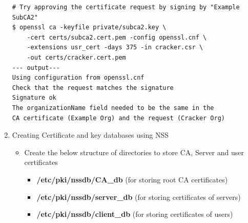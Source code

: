 \documentclass[a4paper]{article}
\begin{document}
\begin{enumerate}[label*=\arabic*.]
\begin{lstlisting}[style=bashInputStyle]
# Try approving the certificate request by signing by "Example SubCA2"
$ openssl ca -keyfile private/subca2.key \
    -cert certs/subca2.cert.pem -config openssl.cnf \
    -extensions usr_cert -days 375 -in cracker.csr \
    -out certs/cracker.cert.pem
--- output---
Using configuration from openssl.cnf
Check that the request matches the signature
Signature ok
The organizationName field needed to be the same in the
CA certificate (Example Org) and the request (Cracker Org)
            \end{lstlisting}
    \item Creating Certificate and key databases using NSS 
        \begin{itemize}
            \item Create the below structure of directories to store CA, Server and user certificates
                \begin{itemize}
                    \item \textbf{/etc/pki/nssdb/CA\_db} (for storing root CA certificates)
                    \item \textbf{/etc/pki/nssdb/server\_db} (for storing certificates of servers)
                    \item \textbf{/etc/pki/nssdb/client\_db} (for storing certificates of users)
                \end{itemize}
            

\end{itemize}
\end{enumerate}
\end{document}
